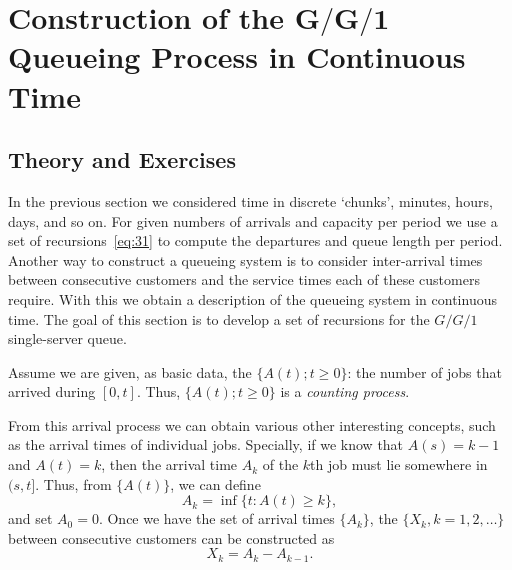 \section
[Construction of the $G/G/1$ Queueing Process in Continuous Time]
{Construction of the $\mathbf{G/G/1}$ Queueing Process in Continuous Time}
\label{sec:constr-gg1-queu}

\subsection*{Theory and Exercises}


In the previous section we considered time in discrete `chunks',
minutes, hours, days, and so on. For given numbers of arrivals and
capacity per period we use a set of recursions~\eqref{eq:31} to
compute the departures and queue length per period. Another way to
construct a queueing system is to consider inter-arrival times between
consecutive customers and the service times each of these customers
require. With this we obtain a description of the queueing system in
continuous time.  The goal of this section is to develop a set of
recursions for the $G/G/1$ single-server queue.

Assume we are given, as basic data, the 
$\{A(t); t\geq 0\}$: the number of jobs that arrived during $[0,t]$.
Thus, $\{A(t); t\geq 0\}$ is a \emph{counting process}.

From this arrival process we can obtain various other interesting
concepts, such as the arrival times of individual jobs. Specially, if
we know that $A(s) = k-1$ and $A(t) = k$, then the arrival time $A_k$
of the $k$th job must lie somewhere in $(s,t]$. Thus, from $\{A(t)\}$, we can define
\begin{equation}\label{eq:27}
  A_k = \inf\{t: A(t) \geq k\},
\end{equation}
and set $A_0 = 0$. Once we have the set of arrival times $\{A_k\}$,
the  $\{X_k, k=1, 2, \ldots\}$ between
consecutive customers can be constructed as
\begin{equation}
  X_k = A_k - A_{k-1}.
\end{equation}

